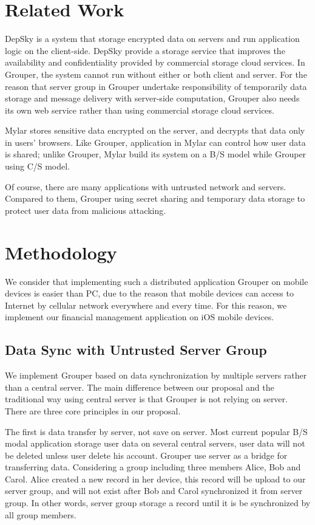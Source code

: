 \documentclass[twocolumn,10pt]{article}
\begin{document}
\section{Related Work}

DepSky\cite{bessani2013depsky} is a system that storage encrypted data on servers and run application logic on the client-side\cite{wang2016sieve}. DepSky provide a storage service that improves the availability and confidentiality provided by commercial storage cloud services. In Grouper, the system cannot run without either or both client and server. For the reason that server group in Grouper undertake responsibility of temporarily data storage and message delivery with server-side computation, Grouper also needs its own web service rather than using commercial storage cloud services.

Mylar\cite{popa2014building} stores sensitive data encrypted on the server, and decrypts that data only in users’ browsers. Like Grouper, application in Mylar can control how user data is shared\cite{wang2016sieve}; unlike Grouper, Mylar build its system on a B/S model while Grouper using C/S model.

Of course, there are many applications with untrusted network and servers. Compared to them, Grouper using secret sharing and temporary data storage to protect user data from malicious attacking.
\section{Methodology}

We consider that implementing such a distributed application Grouper on mobile devices is easier than PC, due to the reason that mobile devices can access to Internet by cellular network everywhere and every time. For this reason, we implement our financial management application on iOS mobile devices. 

\subsection{Data Sync with Untrusted Server Group}

We implement Grouper based on data synchronization by multiple servers rather than a central server. The main difference between our proposal and the traditional way using central server is that Grouper is not relying on server. There are three core principles in our proposal. 

The first is data transfer by server, not save on server. Most current popular B/S modal application storage user data on several central servers, user data will not be deleted unless user delete his account. Grouper use server as a bridge for transferring data. Considering a group including three members Alice, Bob and Carol. Alice created a new record in her device, this record will be upload to our server group, and will not exist after Bob and Carol synchronized it from server group. In other words, server group storage a record until it is be synchronized by all group members.
\end{document}
